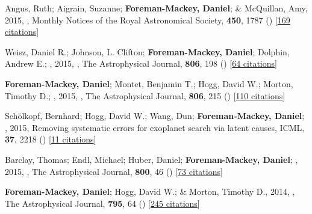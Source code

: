 \item[{\color{numcolor}\scriptsize11}] Angus, Ruth; Aigrain, Suzanne; \textbf{Foreman-Mackey, Daniel}; \& McQuillan, Amy, 2015, , Monthly Notices of the Royal Astronomical Society, \textbf{450}, 1787 () [\href{https://ui.adsabs.harvard.edu/abs/2015MNRAS.450.1787A}{169 citations}]

\item[{\color{numcolor}\scriptsize10}] Weisz, Daniel R.; Johnson, L. Clifton; \textbf{Foreman-Mackey, Daniel}; Dolphin, Andrew E.; \etal, 2015, , The Astrophysical Journal, \textbf{806}, 198 () [\href{https://ui.adsabs.harvard.edu/abs/2015ApJ...806..198W}{64 citations}]

\item[{\color{numcolor}\scriptsize9}] \textbf{Foreman-Mackey, Daniel}; Montet, Benjamin T.; Hogg, David W.; Morton, Timothy D.; \etal, 2015, , The Astrophysical Journal, \textbf{806}, 215 () [\href{https://ui.adsabs.harvard.edu/abs/2015ApJ...806..215F}{110 citations}]

\item[{\color{numcolor}\scriptsize8}] Sch{\"o}lkopf, Bernhard; Hogg, David W.; Wang, Dun; \textbf{Foreman-Mackey, Daniel}; \etal, 2015, Removing systematic errors for exoplanet search via latent causes, ICML, \textbf{37}, 2218 () [\href{https://scholar.google.com/scholar?cites=11768165421845046384}{11 citations}]

\item[{\color{numcolor}\scriptsize7}] Barclay, Thomas; Endl, Michael; Huber, Daniel; \textbf{Foreman-Mackey, Daniel}; \etal, 2015, , The Astrophysical Journal, \textbf{800}, 46 () [\href{https://ui.adsabs.harvard.edu/abs/2015ApJ...800...46B}{73 citations}]

\item[{\color{numcolor}\scriptsize6}] \textbf{Foreman-Mackey, Daniel}; Hogg, David W.; \& Morton, Timothy D., 2014, , The Astrophysical Journal, \textbf{795}, 64 () [\href{https://ui.adsabs.harvard.edu/abs/2014ApJ...795...64F}{245 citations}]

